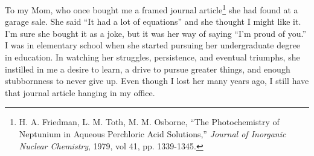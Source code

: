 
To my Mom, who once bought me a framed journal article\footnote{H. A. Friedman, L. M. Toth, M. M. Osborne, ``The Photochemistry of Neptunium in Aqueous Perchloric Acid Solutions,'' \textit{Journal of Inorganic Nuclear Chemistry}, 1979, vol 41, pp. 1339-1345.} she had found at a garage sale.  She said ``It had a lot of equations'' and she thought I might like it.  I'm sure she bought it as a joke, but it was her way of saying ``I'm proud of you.''  I was in elementary school when she started pursuing her undergraduate degree in education.  In watching her struggles, persistence, and eventual triumphs, she instilled in me a desire to learn, a drive to pursue greater things, and enough stubbornness to never give up.  Even though I lost her many years ago, I still have that journal article hanging in my office.